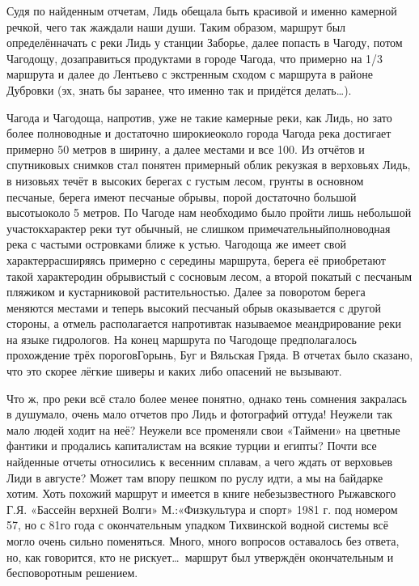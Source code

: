 Судя по найденным отчетам, Лидь обещала быть красивой и именно камерной речкой, чего так жаждали наши души. Таким образом, маршрут был определён\mdash начать с реки Лидь у станции Заборье, далее попасть в Чагоду, потом Чагодощу, дозаправиться продуктами в городе Чагода, что примерно на 1/3 маршрута и далее до Лентьево с экстренным сходом с маршрута в районе Дубровки (эх, знать бы заранее, что именно так и придётся делать\ldots).
 
Чагода и Чагодоща, напротив, уже не такие камерные реки, как Лидь, но зато более полноводные и достаточно широкие\mdash около города Чагода река достигает примерно 50 метров в ширину, а далее местами и все 100. Из отчётов и спутниковых снимков стал понятен примерный облик рек\mdash узкая в верховьях Лидь, в низовьях течёт в высоких берегах с густым лесом, грунты в основном песчаные, берега имеют песчаные обрывы, порой достаточно большой высоты\mdash около 5 метров. По Чагоде нам необходимо было пройти лишь небольшой участок\mdash характер реки тут обычный, не слишком примечательный\mdash полноводная река с частыми островками ближе к устью. Чагодоща же имеет свой характер\mdash расширяясь примерно с середины маршрута, берега её приобретают такой характер\mdash один обрывистый с сосновым лесом, а второй покатый с песчаным пляжиком и кустарниковой растительностью. Далее за поворотом берега меняются местами и теперь высокий песчаный обрыв оказывается с другой стороны, а отмель располагается напротив\mdash так называемое меандрирование реки на языке гидрологов. На конец маршрута по Чагодоще предполагалось прохождение трёх порогов\mdash Горынь, Буг и Вяльская Гряда. В отчетах было сказано, что это скорее лёгкие шиверы и каких либо опасений не вызывают. 

Что ж, про реки всё стало более менее понятно, однако тень сомнения закралась в душу\mdash мало, очень мало отчетов про Лидь и фотографий оттуда! Неужели так мало людей ходит на неё? Неужели все променяли свои «Таймени» на цветные фантики и продались капиталистам на всякие турции и египты? Почти все найденные отчеты относились к весенним сплавам, а чего ждать от верховьев Лиди в августе? Может там впору пешком по руслу идти, а мы на байдарке хотим. Хоть похожий маршрут и имеется в книге небезызвестного Рыжавского Г.Я. «Бассейн верхней Волги» М.:«Физкультура и спорт» 1981 г. под номером 57, но с 81\sdash го года с окончательным упадком Тихвинской водной системы всё могло очень сильно поменяться. Много, много вопросов оставалось без ответа, но, как говорится, кто не рискует\ldots~маршрут был утверждён окончательным и бесповоротным решением.

